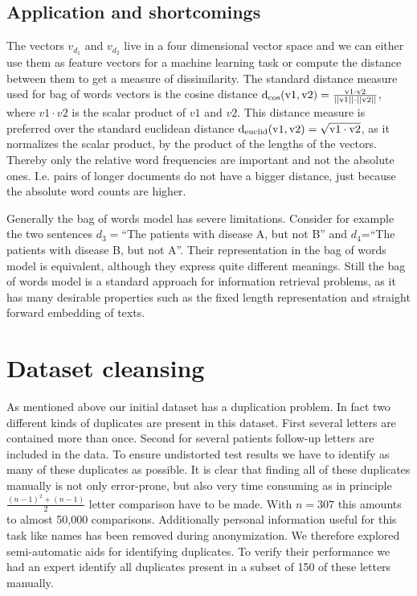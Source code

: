 \subsection*{Application and shortcomings}
The vectors $v_{d_1}$ and $v_{d_2}$ live in a four dimensional vector space and we can either use them as feature vectors for a machine learning task or compute the distance between them to get a measure of dissimilarity. The standard distance measure used for bag of words vectors is the cosine distance $\rm{d_{\cos}}(v1, v2)=\frac{v1\cdot v2}{||v1||\cdot ||v2||}$, where $v1\cdot v2$ is the scalar product of $v1$ and $v2$. This distance measure is preferred over the standard euclidean distance $\rm{d_{euclid}}(v1, v2)=\sqrt{v1\cdot v2}$, as it normalizes the scalar product, by the product of the lengths of the vectors. Thereby only the relative word frequencies are important and not the absolute ones. I.e. pairs of longer documents do not have a bigger distance, just because the absolute word counts are higher. 

Generally the bag of words model has severe limitations. Consider for example
the two sentences $d_{3}=$``The patients with disease A, but not B'' and $d_{4}$=``The patients with disease B, but not A''. Their representation in the bag of words model is equivalent,
although they express quite different meanings. Still the bag of words
model is a standard approach for information retrieval problems, as
it has many desirable properties such as the fixed length representation and straight forward embedding of texts.



\section{Dataset cleansing}

As mentioned above our initial dataset has a duplication problem. In fact two different kinds of duplicates are present in this dataset. First several letters are contained more than once. Second for several patients follow-up letters are included in the data. To ensure undistorted test results we have to identify as many of these duplicates as possible. It is clear that finding all of these duplicates manually is not only error-prone, but also very time consuming as in principle $\frac{(n-1)^2 + (n-1)}{2}$ letter comparison have to be made. With $n=307$ this amounts to almost 50,000 comparisons. Additionally personal information useful for this task like names has been removed during anonymization. We therefore explored semi-automatic aids for identifying duplicates. To verify their performance we had an expert identify all duplicates present in a subset of 150 of these letters manually.

